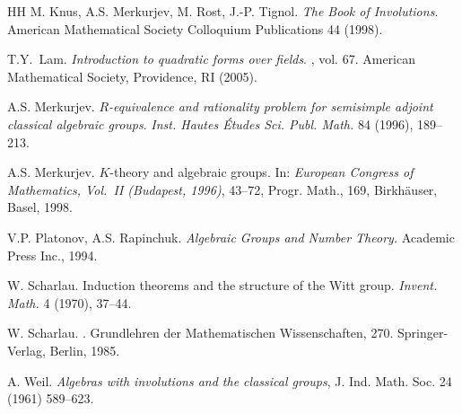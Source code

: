 \documentclass[twoside,11pt]{amsart}
\numberwithin{equation}{section}
\theoremstyle{definition}
\begin{document}
\begin{thebibliography}{HH}
 M. Knus, A.S. Merkurjev, M. Rost,  J.-P. Tignol. \emph{The Book of Involutions}. American Mathematical Society Colloquium Publications 44 (1998).

 T.Y.~Lam. \newblock \emph{Introduction to quadratic forms over fields}. , vol. 67. American Mathematical Society, Providence, RI (2005).
    
 A.S. Merkurjev. \emph{$R$-equivalence and rationality problem for semisimple adjoint classical algebraic groups}. {\em Inst. Hautes Études Sci. Publ. Math.} 84 (1996), 189--213. 

A.S. Merkurjev. $K$-theory and algebraic groups. In: \emph{European Congress of Mathematics, Vol.\ II (Budapest, 1996)}, 43--72, Progr. Math., 169, Birkh\"auser, Basel, 1998. 

V.P. Platonov, A.S. Rapinchuk. \emph{Algebraic Groups and Number Theory.} Academic Press Inc., 1994.

W. Scharlau.
Induction theorems and the structure of the Witt group.
\emph{Invent. Math.} 4 (1970), 37--44.

W. Scharlau.
. 
\newblock Grundlehren der Mathe\-matischen Wissenschaften, {270}. Springer-Verlag, Berlin, 1985. 

 A. Weil. \emph{Algebras with involutions and the classical groups}, J. Ind. Math. Soc. 24 (1961) 589--623.
\end{thebibliography}
\end{document}
